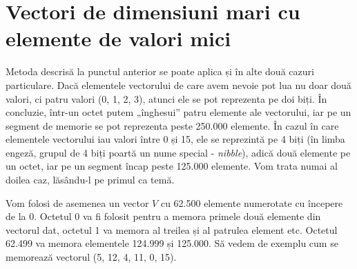\section{Vectori de dimensiuni mari cu elemente de valori mici}

Metoda descrisă la punctul anterior se poate aplica și în alte două cazuri
particulare. Dacă elementele vectorului de care avem nevoie pot lua nu doar
două valori, ci patru valori (0, 1, 2, 3), atunci ele se pot reprezenta pe doi
biți. În concluzie, într-un octet putem „înghesui” patru elemente ale
vectorului, iar pe un segment de memorie se pot reprezenta peste 250.000
elemente. În cazul în care elementele vectorului iau valori între 0 și 15, ele
se reprezintă pe 4 biți (în limba engeză, grupul de 4 biți poartă un nume
special - {\it nibble}), adică două elemente pe un octet, iar pe un segment
încap peste 125.000 elemente. Vom trata numai al doilea caz, lăsându-l pe
primul ca temă.

Vom folosi de asemenea un vector $V$ cu 62.500 elemente numerotate cu începere
de la 0. Octetul 0 va fi folosit pentru a memora primele două elemente din
vectorul dat, octetul 1 va memora al treilea și al patrulea element
etc. Octetul 62.499 va memora elementele 124.999 și 125.000. Să vedem de
exemplu cum se memorează vectorul (5, 12, 4, 11, 0, 15).


